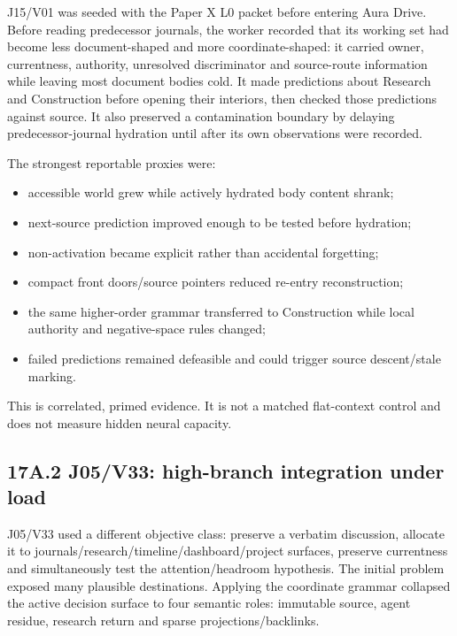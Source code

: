 \documentclass[
  10pt,
  letterpaper,
]{article}
\providecommand{\tightlist}{%
  \setlength{\itemsep}{0pt}\setlength{\parskip}{0pt}}
\begin{document}
J15/V01 was seeded with the Paper X L0 packet before entering Aura
Drive. Before reading predecessor journals, the worker recorded that its
working set had become less document-shaped and more coordinate-shaped:
it carried owner, currentness, authority, unresolved discriminator and
source-route information while leaving most document bodies cold. It
made predictions about Research and Construction before opening their
interiors, then checked those predictions against source. It also
preserved a contamination boundary by delaying predecessor-journal
hydration until after its own observations were recorded.

The strongest reportable proxies were:

\begin{itemize}
\tightlist
\item
  accessible world grew while actively hydrated body content shrank;
\item
  next-source prediction improved enough to be tested before hydration;
\item
  non-activation became explicit rather than accidental forgetting;
\item
  compact front doors/source pointers reduced re-entry reconstruction;
\item
  the same higher-order grammar transferred to Construction while local
  authority and negative-space rules changed;
\item
  failed predictions remained defeasible and could trigger source
  descent/stale marking.
\end{itemize}

This is correlated, primed evidence. It is not a matched flat-context
control and does not measure hidden neural capacity.

\subsection{17A.2 J05/V33: high-branch integration under
load}\label{17a2-j05v33-high-branch-integration-under-load}

J05/V33 used a different objective class: preserve a verbatim
discussion, allocate it to journals/research/timeline/dashboard/project
surfaces, preserve currentness and simultaneously test the
attention/headroom hypothesis. The initial problem exposed many
plausible destinations. Applying the coordinate grammar collapsed the
active decision surface to four semantic roles: immutable source, agent
residue, research return and sparse projections/backlinks.
\end{document}
